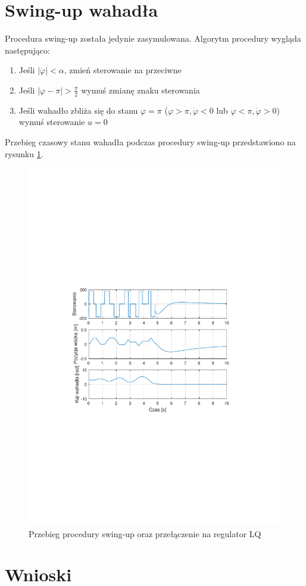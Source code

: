 \documentclass[12pt]{article}
\begin{document}
\section{Swing-up wahadła}

Procedura swing-up została jedynie zasymulowana. Algorytm procedury wygląda
następująco:

\begin{enumerate}
  \item Jeśli $|\dot{\varphi}| < \alpha$, zmień sterowanie na przeciwne
  \item Jeśli $|\varphi - \pi| > \frac{\pi}{2}$ wymuś zmianę znaku sterowania
  \item Jeśli wahadło zbliża się do stanu $\varphi = \pi$ ($\varphi > \pi,
  \dot{\varphi} < 0$ lub $\varphi < \pi, \dot{\varphi} > 0$) wymuś sterowanie
  $u = 0$
\end{enumerate}

Przebieg czasowy stanu wahadła podczas procedury swing-up przedstawiono na
rysunku \ref{rys:swingup}.

\begin{figure}[!htb]
    \begin{center}
        \includegraphics[width=16cm,trim=3cm 9cm 3cm 9cm,clip]
        {../res/img/swingup.pdf}
    \end{center}
    \caption{Przebieg procedury swing-up oraz przełączenie na regulator LQ}
    \label{rys:swingup}
\end{figure}

\newpage

\section{Wnioski}
\end{document}
